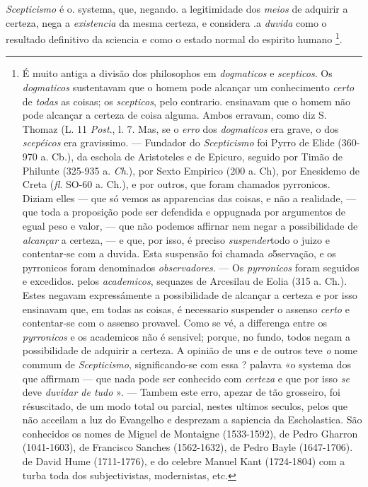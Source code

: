        
\emph{Scepticismo} é o. systema, que, negando. a legitimidade dos \emph{meios} de adquirir a certeza, nega a \emph{existencia} da mesma certeza, e considera .a \emph{duvida} como o resultado definitivo da sciencia e como o estado normal do espirito humano \footnote{É muito antiga a divisão dos philosophos em \emph{dogmaticos} e \emph{scepticos}. Os \emph{dogmaticos} sustentavam que o homem pode alcançar um conhecimento \emph{certo} de \emph{todas} as coisas; os \emph{scepticos}, pelo contrario. ensinavam que o homem não pode alcançar a certeza de coisa alguma. Ambos erravam, como diz S. Thomaz (L. 11 \emph{Post}., l. 7. Mas, se o \emph{erro} dos \emph{dogmaticos} era grave, o dos \emph{scepéicos} era gravissimo. --- Fundador do \emph{Scepticismo} foi Pyrro de Elide (360-970 a. Cb.), da eschola de Aristoteles e de Epicuro, seguido por Timão de Philunte (325-935 a. \emph{Ch}.), por Sexto Empirico (200 a. Ch), por Enesidemo de Creta (\emph{fl}. SO-60 a. Ch.), e por outros, que foram chamados pyrronicos. Diziam elles --- que só vemos as apparencias das coisas, e não a realidade, --- que toda a proposição pode ser defendida e oppugnada por argumentos de egual peso e valor, --- que não podemos affirnar nem negar a possibilidade de \emph{alcançar} a certeza, --- e que, por isso, é preciso \emph{suspender}todo o juizo e contentar-se com a duvida. Esta suspensão foi chamada \emph{o}5servação, e os pyrronicos foram denominados \emph{observadores}. --- Os \emph{pyrronicos} foram seguidos e excedidos. pelos \emph{academicos}, sequazes de Arcesilau de Eolia (315 a. Ch.). Estes negavam expressámente a possibilidade de alcançar a certeza e por isso ensinavam que, em todas as coisas, é necessario suspender o assenso \emph{certo} e contentar-se com o assenso provavel. Como se vé, a differenga entre os \emph{pyrronicos} e os academicos não é sensivel; porque, no fundo, todos negam a possibilidade de adquirir a certeza. A opinião de uns e de outros teve \emph{o} nome commum de \emph{Scepticismo}, significando-se com essa ? palavra «o systema dos que affirmam --- que nada pode ser conhecido com \emph{certeza} e que por isso \emph{se} deve \emph{duvidar de tudo} ». --- Tambem este erro, apezar de tão grosseiro, foi résuscitado, de um modo total ou parcial, nestes ultimos seculos, pelos que não acceilam a luz do Evangelho e desprezam a sapiencia da Escholastica. São conhecidos os nomes de Miguel de Montaigne (1533-1592), de Pedro Gharron (1041-1603), de Francisco Sanches (1562-1632), de Pedro Bayle (1647-1706). de David Hume (1711-1776), e do celebre Manuel Kant (1724-1804) com a turba toda dos subjectivistas, modernistas, etc.}.

